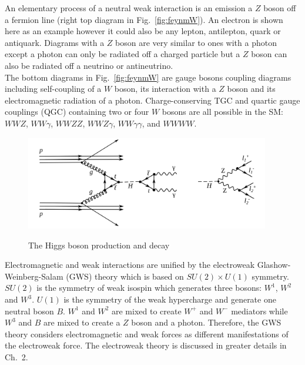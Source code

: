 An elementary process of a neutral weak interaction is an emission a $Z$ boson off a fermion line (right top diagram in Fig.~\ref{fig:feynmW}). An electron is shown here as an example however it could also be any lepton, antilepton, quark or antiquark. Diagrams with a $Z$ boson are very similar to ones with a photon except a photon can only be radiated off a charged particle but a $Z$ boson can also be radiated off a neutrino or antineutrino.\\

The bottom diagrams in Fig.~\ref{fig:feynmW} are gauge bosons coupling diagrams including self-coupling of a $W$ boson, its interaction with a $Z$ boson and its electromagnetic radiation of a photon. Charge-conserving TGC and quartic gauge couplings (QGC) containing two or four $W$ bosons are all possible in the SM: $WWZ$, $WW\gamma$, $WWZZ$, $WWZ\gamma$, $WW\gamma\gamma$, and $WWWW$.\\

\begin{figure}[htb]
  \begin{center}
    {\includegraphics[width=0.95\textwidth]{../figs/Intro/FeynmanHiggs.png}}
    \caption{The Higgs boson production and decay}
    \label{fig:higgsProduction}
  \end{center}
\end{figure}

Electromagnetic and weak interactions are unified by the electroweak Glashow-Weinberg-Salam (GWS) theory which is based on $SU(2) \times U(1)$ symmetry. $SU(2)$ is the symmetry of weak isospin which generates three bosons: $W^1$, $W^2$ and $W^3$. $U(1)$ is the symmetry of the weak hypercharge and generate one neutral boson $B$. $W^1$ and $W^2$ are mixed to create $W^+$ and $W^-$ mediators while $W^3$ and $B$ are mixed to create a $Z$ boson and a photon. Therefore, the GWS theory considers electromagnetic and weak forces as different manifestations of the electroweak force. The electroweak theory is discussed in greater details in Ch.~2.\\

